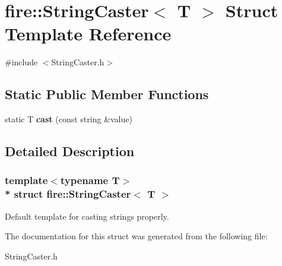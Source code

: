 \hypertarget{a00292}{}\section{fire\+:\+:String\+Caster$<$ T $>$ Struct Template Reference}
\label{a00292}


{\ttfamily \#include $<$String\+Caster.\+h$>$}

\subsection*{Static Public Member Functions}
\begin{DoxyCompactItemize}
\item 
static T {\bfseries cast} (const string \&value)\hypertarget{a00292_a2f87754c1c9d5cfe64acebbaafddbbae}{}\label{a00292_a2f87754c1c9d5cfe64acebbaafddbbae}

\end{DoxyCompactItemize}


\subsection{Detailed Description}
\subsubsection*{template$<$typename T$>$\\*
struct fire\+::\+String\+Caster$<$ T $>$}

Default template for casting strings properly. 

The documentation for this struct was generated from the following file\+:\begin{DoxyCompactItemize}
\item 
String\+Caster.\+h\end{DoxyCompactItemize}
